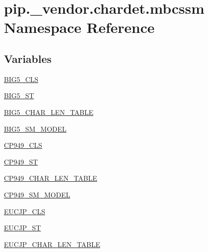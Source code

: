 \hypertarget{namespacepip_1_1__vendor_1_1chardet_1_1mbcssm}{}\section{pip.\+\_\+vendor.\+chardet.\+mbcssm Namespace Reference}
\label{namespacepip_1_1__vendor_1_1chardet_1_1mbcssm}
\subsection*{Variables}
\begin{DoxyCompactItemize}
\item 
\hyperlink{namespacepip_1_1__vendor_1_1chardet_1_1mbcssm_ab3ceacb7b1dea76be806f050327da13b}{B\+I\+G5\+\_\+\+C\+LS}
\item 
\hyperlink{namespacepip_1_1__vendor_1_1chardet_1_1mbcssm_a3ca66dafded130441cbe7253c268e38b}{B\+I\+G5\+\_\+\+ST}
\item 
\hyperlink{namespacepip_1_1__vendor_1_1chardet_1_1mbcssm_a446e4393968d4f868bb09e802ce9eacd}{B\+I\+G5\+\_\+\+C\+H\+A\+R\+\_\+\+L\+E\+N\+\_\+\+T\+A\+B\+LE}
\item 
\hyperlink{namespacepip_1_1__vendor_1_1chardet_1_1mbcssm_a14852ee0ad411df11017aafd3e8adb37}{B\+I\+G5\+\_\+\+S\+M\+\_\+\+M\+O\+D\+EL}
\item 
\hyperlink{namespacepip_1_1__vendor_1_1chardet_1_1mbcssm_a17cf8a1741a649d7e8d13caf0eb5ae58}{C\+P949\+\_\+\+C\+LS}
\item 
\hyperlink{namespacepip_1_1__vendor_1_1chardet_1_1mbcssm_a492b3f454d23f4a2e9068ce0145f5415}{C\+P949\+\_\+\+ST}
\item 
\hyperlink{namespacepip_1_1__vendor_1_1chardet_1_1mbcssm_a74888598ad0b6c58b9f3319b7a091e12}{C\+P949\+\_\+\+C\+H\+A\+R\+\_\+\+L\+E\+N\+\_\+\+T\+A\+B\+LE}
\item 
\hyperlink{namespacepip_1_1__vendor_1_1chardet_1_1mbcssm_a87b108becdf0d9d2ed4133568c3dc6a2}{C\+P949\+\_\+\+S\+M\+\_\+\+M\+O\+D\+EL}
\item 
\hyperlink{namespacepip_1_1__vendor_1_1chardet_1_1mbcssm_a42e4da214bbf7e9c1b8768915f4ddd3d}{E\+U\+C\+J\+P\+\_\+\+C\+LS}
\item 
\hyperlink{namespacepip_1_1__vendor_1_1chardet_1_1mbcssm_a69c2c94b375f7f6b5280fbff3a517b43}{E\+U\+C\+J\+P\+\_\+\+ST}
\item 
\hyperlink{namespacepip_1_1__vendor_1_1chardet_1_1mbcssm_ad867b4d5b8866772c73e9cfce7b9a770}{E\+U\+C\+J\+P\+\_\+\+C\+H\+A\+R\+\_\+\+L\+E\+N\+\_\+\+T\+A\+B\+LE}

\end{DoxyCompactItemize}
